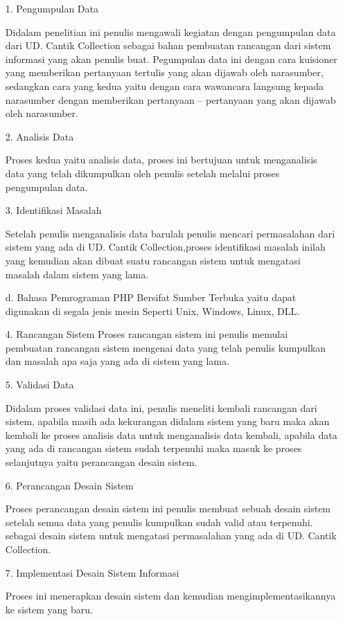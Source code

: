 \documentclass{jtetiproposalskripsi}
\begin{document}
\begin{itemize}
\item[1.]Pengumpulan Data

Didalam penelitian ini penulis mengawali kegiatan dengan pengumpulan data dari UD. Cantik Collection sebagai bahan pembuatan rancangan dari sistem informasi yang akan penulis buat. Pegumpulan data ini dengan cara kuisioner yang memberikan pertanyaan tertulis yang akan dijawab oleh narasumber, sedangkan cara yang kedua yaitu dengan cara wawancara langsung kepada narasumber dengan memberikan pertanyaan – pertanyaan yang akan dijawab oleh narasumber.

\item[2.] Analisis Data

Proses kedua yaitu analisis data, proses ini bertujuan untuk menganalisis data yang telah dikumpulkan oleh penulis setelah melalui proses pengumpulan data.

\item[3.]Identifikasi Masalah

Setelah penulis menganalisis data barulah penulis mencari permasalahan dari sistem yang ada di UD. Cantik Collection,proses identifikasi masalah inilah yang kemudian akan dibuat suatu rancangan sistem untuk mengatasi masalah dalam sistem yang lama.
\item[d.] Bahasa Pemrograman PHP Bersifat Sumber Terbuka yaitu dapat digunakan di segala jenis mesin Seperti Unix, Windows, Linux, DLL.

\item[4.]Rancangan Sistem
Proses rancangan sistem ini penulis memulai pembuatan rancangan sistem mengenai data yang telah penulis kumpulkan dan masalah apa saja yang ada di sistem yang lama.

\item[5.]Validasi Data

Didalam proses validasi data ini, penulis meneliti kembali rancangan dari sistem, apabila masih ada kekurangan didalam sistem yang baru maka akan kembali ke proses analisis data untuk menganalisis data kembali, apabila data yang ada di rancangan sistem sudah terpenuhi maka masuk ke proses selanjutnya yaitu perancangan desain sistem.

\item[6.]Perancangan Desain Sistem

Proses perancangan desain sistem ini penulis membuat sebuah desain sistem setelah semua data yang penulis kumpulkan sudah valid atau terpenuhi. sebagai desain sistem untuk mengatasi permasalahan yang ada di UD. Cantik Collection.

\item[7.]Implementasi Desain Sistem Informasi

Proses ini menerapkan desain sistem dan kemudian mengimplementasikannya ke sistem yang baru.

\end{itemize}
\end{document}
